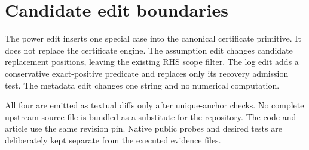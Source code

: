 \documentclass[11pt,letterpaper]{article}
\begin{document}
\section{Candidate edit boundaries}

The power edit inserts one special case into the canonical certificate primitive. It does not replace the certificate engine. The assumption edit changes candidate replacement positions, leaving the existing RHS scope filter. The log edit adds a conservative exact-positive predicate and replaces only its recovery admission test. The metadata edit changes one string and no numerical computation.

All four are emitted as textual diffs only after unique-anchor checks. No complete upstream source file is bundled as a substitute for the repository. The code and article use the same revision pin. Native public probes and desired tests are deliberately kept separate from the executed evidence files.
\end{document}
